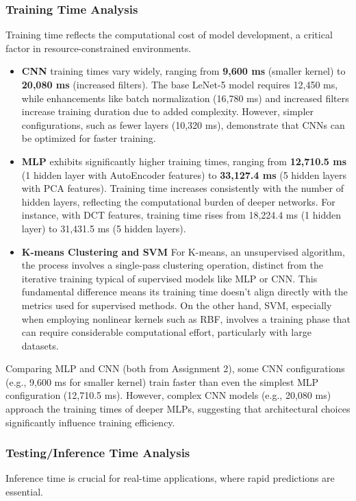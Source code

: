 \documentclass[a4paper,12pt]{article}
\begin{document}
\subsubsection{Training Time Analysis}
Training time reflects the computational cost of model development, a critical factor in resource-constrained environments.

\begin{itemize}
    \item \textbf{CNN} training times vary widely, ranging from \textbf{9,600 ms} (smaller kernel) to \textbf{20,080 ms} (increased filters). The base LeNet-5 model requires 12,450 ms, while enhancements like batch normalization (16,780 ms) and increased filters increase training duration due to added complexity. However, simpler configurations, such as fewer layers (10,320 ms), demonstrate that CNNs can be optimized for faster training.
    
    \item \textbf{MLP} exhibits significantly higher training times, ranging from \textbf{12,710.5 ms} (1 hidden layer with AutoEncoder features) to \textbf{33,127.4 ms} (5 hidden layers with PCA features). Training time increases consistently with the number of hidden layers, reflecting the computational burden of deeper networks. For instance, with DCT features, training time rises from 18,224.4 ms (1 hidden layer) to 31,431.5 ms (5 hidden layers).
    
    \item \textbf{K-means Clustering and SVM} For K-means, an unsupervised algorithm, the process involves a single-pass clustering operation, distinct from the iterative training typical of supervised models like MLP or CNN. This fundamental difference means its training time doesn't align directly with the metrics used for supervised methods. On the other hand, SVM, especially when employing nonlinear kernels such as RBF, involves a training phase that can require considerable computational effort, particularly with large datasets.\\
\end{itemize}
Comparing MLP and CNN (both from Assignment 2), some CNN configurations (e.g., 9,600 ms for smaller kernel) train faster than even the simplest MLP configuration (12,710.5 ms). However, complex CNN models (e.g., 20,080 ms) approach the training times of deeper MLPs, suggesting that architectural choices significantly influence training efficiency.

\subsubsection{Testing/Inference Time Analysis}
Inference time is crucial for real-time applications, where rapid predictions are essential.
\end{document}

